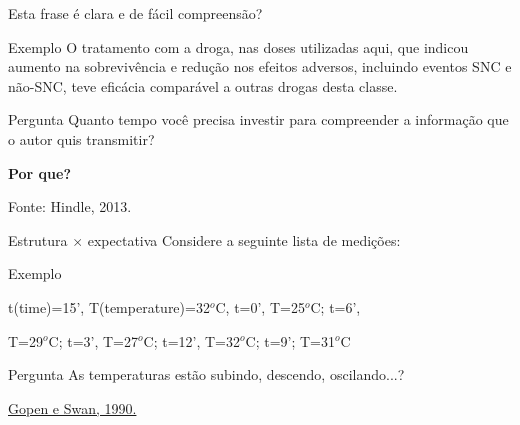 \documentclass{beamer}
\begin{document}
\begin{frame}{\small Esta frase é clara e de fácil compreensão?}
  \begin{exampleblock}{Exemplo}
    \footnotesize
    O tratamento com a droga, nas doses utilizadas aqui, que
    indicou aumento na sobrevivência e redução nos efeitos adversos,
    incluindo eventos SNC e não-SNC, teve eficácia
    comparável a outras drogas desta classe.
  \end{exampleblock}

  \begin{block}{Pergunta}
    \scriptsize
    Quanto tempo você precisa investir para compreender a informação que o autor quis transmitir?

    \begin{center}
      \normalsize \bf Por que?
    \end{center}
  \end{block}

  \vfill
  \scriptsize
  \hfill Fonte: Hindle, 2013.
\end{frame}

\begin{frame}{Estrutura $\times$ expectativa}
  Considere a seguinte lista de medições:
  \begin{exampleblock}{Exemplo}
    \scriptsize
    \begin{center}
    t(time)=15', T(temperature)=32$^o$C, t=0', T=25$^o$C; t=6',

    T=29$^o$C; t=3', T=27$^o$C; t=12', T=32$^o$C; t=9'; T=31$^o$C
  \end{center}
  \end{exampleblock}\pause

  \begin{block}{Pergunta}
    As temperaturas estão subindo, descendo, oscilando...?
  \end{block}
  \vfill
  \scriptsize
  \hfill \href{https://www.georgegopen.com/uploads/1/0/9/0/109073507/gopen___swan_sci_of_sci_writing_am_sci_1990_.pdf}{Gopen e Swan, 1990.}
\end{frame}
\end{document}
